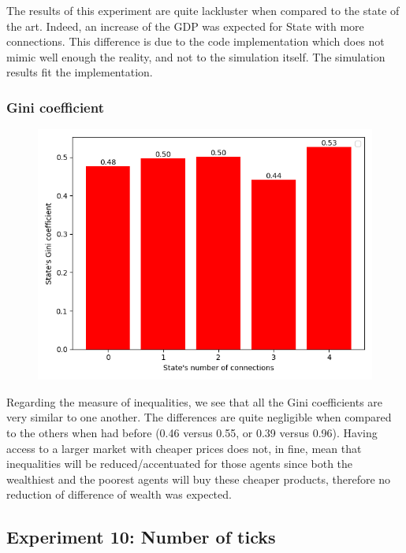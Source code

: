 {{{{{{{{{        The results of this experiment are quite lackluster when compared to the state of the art. Indeed, an increase of the GDP was expected for State with more connections. This difference is due to the code implementation which does not mimic well enough the reality, and not to the simulation itself. The simulation results fit the implementation.
        \par

        \subsubsection{Gini coefficient}

        \begin{figure}
            \includegraphics[width=\linewidth]{img/exp/9_3.png} 
        \end{figure}   
        { Regarding the measure of inequalities, we see that all the Gini coefficients are very similar to one another. The differences are quite negligible when compared to the others when had before (0.46 versus 0.55, or 0.39 versus 0.96). Having access to a larger market with cheaper prices does not, in fine, mean that inequalities will be reduced/accentuated for those agents since both the wealthiest and the poorest agents will buy these cheaper products, therefore no reduction of difference of wealth was expected. 
        \par
    

    \subsection{Experiment 10: Number of ticks}
        
}}}}}}}}}}

